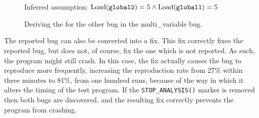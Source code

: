 \begin{figure}
  \hfill
  \\
  \\
  Inferred assumption: $\mathrm{Load}(\texttt{global2}) = 5 \wedge \mathrm{Load}(\texttt{global1}) = 5$
  \caption{Deriving the  for the other bug in the multi\_variable bug.}
  \label{fig:eval:multi_variable:other_bug}
\end{figure}

The reported bug can also be converted into a fix.  This fix correctly
fixes the reported bug, but does not, of course, fix the one which is
not reported.  As such, the program might still crash.  In this case,
the fix actually causes the bug to reproduce more frequently,
increasing the reproduction rate from 27\% within three minutes to
81\%, from one hundred runs, because of the way in which it alters the
timing of the test program.  If the \texttt{STOP\_ANALYSIS()} marker
is removed then both bugs are discovered, and the resulting fix
correctly prevents the program from crashing.

